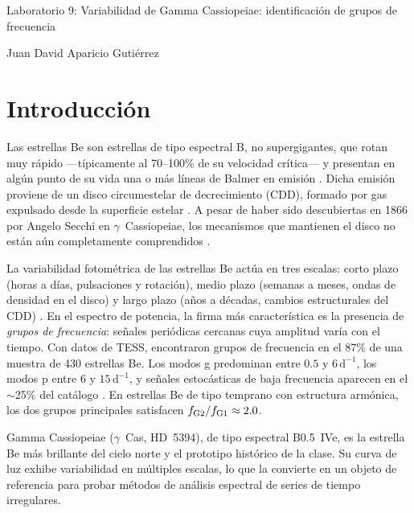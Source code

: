 \documentclass[letterpaper,12pt]{extarticle}
\begin{document}
\begin{center}

    \Large Laboratorio 9: Variabilidad de Gamma Cassiopeiae: identificación de grupos de frecuencia

    \vspace{3mm}

    \large Juan David Aparicio Gutiérrez

    \vspace{3mm}
    \normalsize
\end{center}


\section{Introducción}

Las estrellas Be son estrellas de tipo espectral B, no supergigantes, que rotan muy rápido —típicamente al 70--100\% de su velocidad crítica— y presentan en algún punto de su vida una o más líneas de Balmer en emisión \cite{sabogal2014}. Dicha emisión proviene de un disco circumestelar de decrecimiento (CDD), formado por gas expulsado desde la superficie estelar \cite{rivinius2013}. A pesar de haber sido descubiertas en 1866 por Angelo Secchi en $\gamma$~Cassiopeiae, los mecanismos que mantienen el disco no están aún completamente comprendidos \cite{sabogal2014}.

La variabilidad fotométrica de las estrellas Be actúa en tres escalas: corto plazo (horas a días, pulsaciones y rotación), medio plazo (semanas a meses, ondas de densidad en el disco) y largo plazo (años a décadas, cambios estructurales del CDD) \cite{sabogal2014}. En el espectro de potencia, la firma más característica es la presencia de \textit{grupos de frecuencia}: señales periódicas cercanas cuya amplitud varía con el tiempo. Con datos de TESS, \cite{labadiebartz2022} encontraron grupos de frecuencia en el 87\% de una muestra de 430 estrellas Be. Los modos g predominan entre $0.5$ y $6\,\mathrm{d}^{-1}$, los modos p entre 6 y $15\,\mathrm{d}^{-1}$, y señales estocásticas de baja frecuencia aparecen en el $\sim$25\% del catálogo \cite{labadiebartz2022}. En estrellas Be de tipo temprano con estructura armónica, los dos grupos principales satisfacen $f_{\rm G2}/f_{\rm G1} \approx 2.0$.

Gamma Cassiopeiae ($\gamma$~Cas, HD~5394), de tipo espectral B0.5~IVe, es la estrella Be más brillante del cielo norte y el prototipo histórico de la clase. Su curva de luz exhibe variabilidad en múltiples escalas, lo que la convierte en un objeto de referencia para probar métodos de análisis espectral de series de tiempo irregulares.
\end{document}
